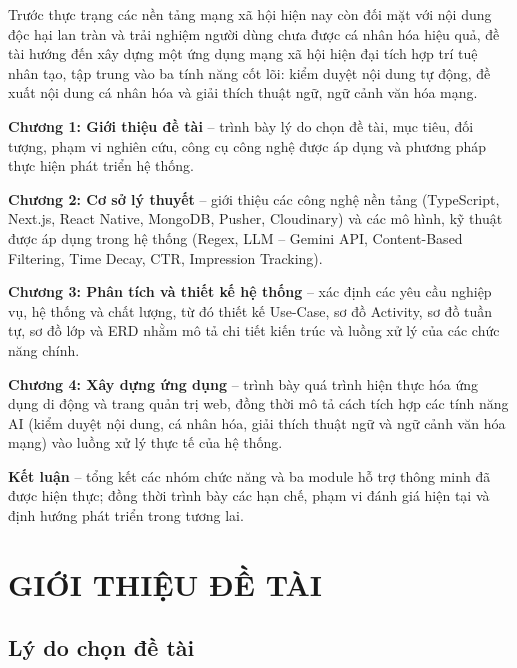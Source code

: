 \clearpage
{}
\setcounter{page}{1}

Trước thực trạng các nền tảng mạng xã hội hiện nay còn đối mặt với nội
dung độc hại lan tràn và trải nghiệm người dùng chưa được cá nhân hóa
hiệu quả, đề tài hướng đến xây dựng một ứng dụng mạng xã hội hiện đại
tích hợp trí tuệ nhân tạo, tập trung vào ba tính năng cốt lõi: kiểm
duyệt nội dung tự động, đề xuất nội dung cá nhân hóa và giải thích thuật
ngữ, ngữ cảnh văn hóa mạng.

\textbf{Chương 1: Giới thiệu đề tài} -- trình bày lý do chọn đề tài, mục
tiêu, đối tượng, phạm vi nghiên cứu, công cụ công nghệ được áp dụng và
phương pháp thực hiện phát triển hệ thống.

\textbf{Chương 2: Cơ sở lý thuyết} -- giới thiệu các công nghệ nền tảng
(TypeScript, Next.js, React Native, MongoDB, Pusher, Cloudinary) và các
mô hình, kỹ thuật được áp dụng trong hệ thống (Regex, LLM -- Gemini API,
Content-Based Filtering, Time Decay, CTR, Impression Tracking).

\textbf{Chương 3: Phân tích và thiết kế hệ thống} -- xác định các yêu
cầu nghiệp vụ, hệ thống và chất lượng, từ đó thiết kế Use-Case, sơ đồ
Activity, sơ đồ tuần tự, sơ đồ lớp và ERD nhằm mô tả chi tiết kiến trúc
và luồng xử lý của các chức năng chính.

\textbf{Chương 4: Xây dựng ứng dụng} -- trình bày quá trình hiện thực
hóa ứng dụng di động và trang quản trị web, đồng thời mô tả cách tích
hợp các tính năng AI (kiểm duyệt nội dung, cá nhân hóa, giải thích thuật
ngữ và ngữ cảnh văn hóa mạng) vào luồng xử lý thực tế của hệ thống.

\textbf{Kết luận} -- tổng kết các nhóm chức năng và ba module hỗ trợ
thông minh đã được hiện thực; đồng thời trình bày các hạn chế, phạm vi
đánh giá hiện tại và định hướng phát triển trong tương lai.

\chapter{GIỚI THIỆU ĐỀ TÀI}


\section{Lý do chọn đề
tài}\label{luxfd-do-chux1ecdn-ux111ux1ec1-tuxe0i}

